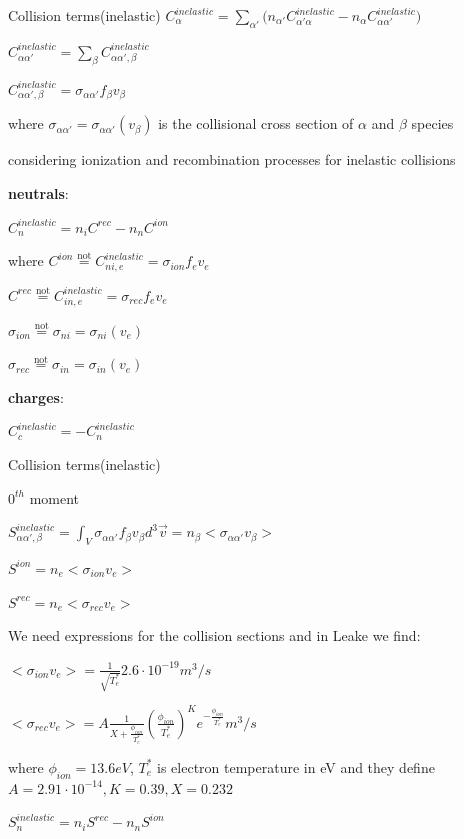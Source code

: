 \documentclass{beamer}
\begin{document}
\begin{frame}{Collision terms(inelastic) }
$C_{\alpha}^{inelastic} = \sum_{\alpha'} {(n_{\alpha'} C_{\alpha'\alpha}^{inelastic} - n_{\alpha} C_{\alpha\alpha'}^{inelastic}}) $

$C_{\alpha\alpha'}^{inelastic} =  \sum_{\beta} {C_{\alpha\alpha',\beta}^{inelastic}  }$

$C_{\alpha\alpha',\beta}^{inelastic} =  \sigma_{\alpha \alpha'} f_{\beta} v_{\beta} $  

where $\sigma_{\alpha \alpha'} = \sigma_{\alpha \alpha'}(v_{\beta}) $  is the collisional cross section of $\alpha$ and $\beta$ species

considering ionization and recombination processes for inelastic collisions

\textbf{neutrals}:

$C_n^{inelastic} = n_i C^{rec} - n_n C^{ion}$ 

where $C^{ion} \stackrel{\text{not}}{=} C_{ni,e}^{inelastic} = \sigma_{ion} f_e v_e$

$C^{rec} \stackrel{\text{not}}{=} C_{in,e}^{inelastic} = \sigma_{rec} f_e v_e $

$\sigma_{ion}  \stackrel{\text{not}}{=}  \sigma_{ni}= \sigma_{ni} (v_e) $

$\sigma_{rec}  \stackrel{\text{not}}{=}   \sigma_{in}= \sigma_{in} (v_e) $

\textbf{charges}:

$C_c^{inelastic} = -C_n^{inelastic}$ 

\end{frame}


\begin{frame}{Collision terms(inelastic) }

{\color{red} $0^{th}$ moment}

$S_{\alpha\alpha',\beta}^{inelastic} = \int_V{\sigma_{\alpha \alpha'} f_{\beta} v_{\beta} d^3\vec{v} } = n_{\beta} <\sigma_{\alpha \alpha'} v_{\beta} >$  


$S^{ion} = n_e <\sigma_{ion} v_e >$ 

$S^{rec} = n_e <\sigma_{rec} v_e >$


We need expressions for the collision sections and in Leake we find:

$<\sigma_{ion} v_e > = \frac{1}{\sqrt{T_e^*}}	2.6 \cdot 10^{-19} m^3/s$

$<\sigma_{rec} v_e > = A \frac{1}{X + \frac{\phi_{ion}}{T_e^*}}	(\frac{\phi_{ion}}{T_e^*})^K  e^{-\frac{\phi_{ion}}{T_e^*} } m^3/s$

where $\phi_{ion} = 13.6 eV$, $T_e^*$ is electron temperature in eV and  they define $A = 2.91 \cdot 10^{-14}, K = 0.39, X = 0.232$


$S_n^{inelastic} = n_i S^{rec} - n_n S^{ion}  $ 




\end{frame}
\end{document}
